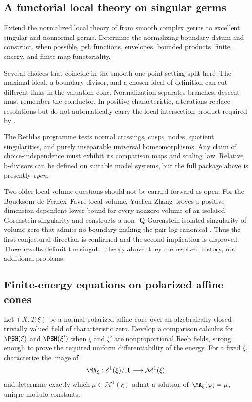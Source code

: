 \subsection{A functorial local theory on singular germs}

\begin{problem}\label{prob:frontier-singular-local}
Extend the normalized local theory of
 from smooth complex germs to excellent
singular and nonnormal germs.  Determine the normalizing boundary datum and
construct, when possible, psh functions, envelopes, bounded products, finite
energy, and finite-map functoriality.
\end{problem}

Several choices that coincide in the smooth one-point setting split here.
The maximal ideal, a boundary divisor, and a chosen ideal of definition can
cut different links in the valuation cone.  Normalization separates
branches; descent must remember the conductor.  In positive characteristic,
alterations replace resolutions but do not automatically carry the local
intersection product required by .

The Rethlas programme tests normal crossings, cusps, nodes, quotient
singularities, and purely inseparable universal homeomorphisms.  Any claim of
choice-independence must exhibit its comparison maps and scaling law.
Relative b-divisors can be defined on suitable model systems, but the full
package above is presently \emph{open}.

Two older local-volume questions should not be carried forward as open.
For the Boucksom--de Fernex--Favre local volume, Yuchen Zhang proves a
positive dimension-dependent lower bound for every nonzero volume of an
isolated Gorenstein singularity and constructs a non-
\(\mathbf Q\)-Gorenstein isolated singularity of volume zero that admits no
boundary making the pair log canonical
\cite{Zhang14LocalVolume}.  Thus the first conjectural
direction is confirmed and the second implication is disproved.  These
results delimit the singular theory above; they are resolved history, not
additional problems.

\subsection{Finite-energy equations on polarized affine cones}

\begin{problem}\label{prob:frontier-affine-cone-ma}
Let \((X,T;\xi)\) be a normal polarized affine cone over an algebraically
closed trivially valued field of characteristic zero.  Develop a comparison
calculus for \(\PSH(\xi)\) and \(\PSH(\xi')\) when \(\xi\) and \(\xi'\) are
nonproportional Reeb fields, strong enough to prove the required uniform
differentiability of the energy.  For a fixed \(\xi\), characterize the image
of
\[
 \MA_\xi:\mathcal E^1(\xi)/\mathbf R
 \longrightarrow \mathcal M^1(\xi),
\]
and determine exactly which \(\mu\in\mathcal M^1(\xi)\) admit a solution of
\(\MA_\xi(\varphi)=\mu\), unique modulo constants.
\end{problem}

